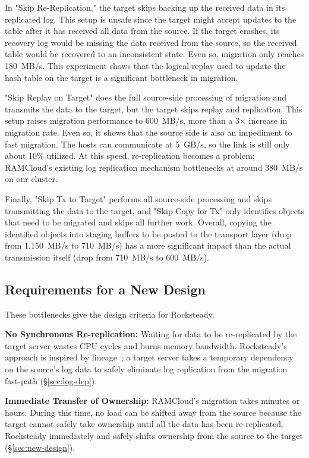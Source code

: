In "Skip Re-Replication," the target skips backing up the
received data in its replicated log. This setup is unsafe since the target might accept
updates to the table after it has received all data from the source. If the
target crashes, its recovery log would be missing the data received from the
source, so the received table would be recovered to an inconsistent state.
Even so, migration only reaches 180~MB/s. This experiment shows that the
logical replay used to update the hash table on the target is a
significant
bottleneck in migration.

"Skip Replay on Target" does the full source-side processing of migration and
transmits the data to the target, but the target skips replay and replication.
This setup raises migration performance
to 600~MB/s, more than a 3$\times$ increase in migration
rate. Even so, it shows that the source side is also an impediment to fast
migration. The hosts can communicate at 5~GB/s, so the link is still only
about 10\% utilized. At this speed, re-replication becomes a
problem; RAMCloud's existing log replication mechanism bottlenecks at around
380~MB/s on our cluster.

Finally, "Skip Tx to Target" performs all source-side processing and skips
transmitting the data to the target, and "Skip Copy for Tx" only identifies
objects that need to be migrated and skips all further work. Overall, copying
the identified objects into staging buffers to be posted to the
transport layer (drop
from 1,150~MB/s to 710~MB/s) has a more significant impact than the
actual transmission
itself (drop from 710~MB/s to 600~MB/s).

\subsection{Requirements for a New Design}

These bottlenecks give the design criteria for Rocksteady.

\noindent
\textbf{No Synchronous Re-replication:} Waiting for data to be re-replicated by
the target server wastes CPU cycles and burns memory bandwidth.
Rocksteady's approach is inspired by
lineage~\cite{spark}; a target server takes a temporary dependency on the
source's log data to safely eliminate log replication from the migration
fast-path (\S\ref{sec:log-dep}).

\noindent
\textbf{Immediate Transfer of Ownership:} RAMCloud's migration takes minutes
or hours. During this time, no load can be shifted away from the source
because the target cannot safely take ownership until all
the data has been re-replicated.  Rocksteady immediately and safely shifts
ownership from the source to the target (\S\ref{sec:new-design}).

